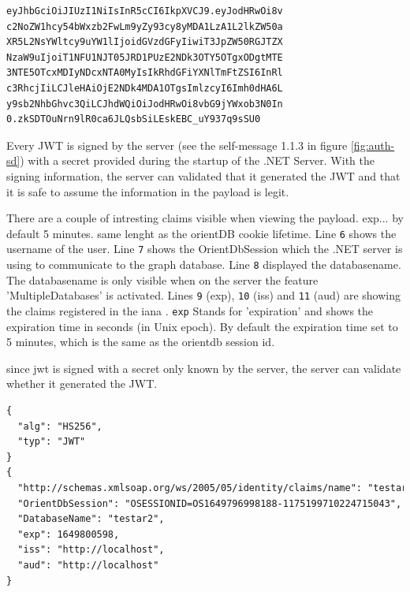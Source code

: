 \begin{lstlisting}[language=xml, caption=Example JSON Web Token (line breaks for display purposes only), style=nonrstyle, label=code:jwt]
eyJhbGciOiJIUzI1NiIsInR5cCI6IkpXVCJ9.eyJodHRwOi8v
c2NoZW1hcy54bWxzb2FwLm9yZy93cy8yMDA1LzA1L2lkZW50a
XR5L2NsYWltcy9uYW1lIjoidGVzdGFyIiwiT3JpZW50RGJTZX
NzaW9uIjoiT1NFU1NJT05JRD1PUzE2NDk3OTY5OTgxODgtMTE
3NTE5OTcxMDIyNDcxNTA0MyIsIkRhdGFiYXNlTmFtZSI6InRl
c3RhcjIiLCJleHAiOjE2NDk4MDA1OTgsImlzcyI6Imh0dHA6L
y9sb2NhbGhvc3QiLCJhdWQiOiJodHRwOi8vbG9jYWxob3N0In
0.zkSDTOuNrn9lR0ca6JLQsbSiLEskEBC_uY937q9sSU0
\end{lstlisting}

Every JWT is signed by the server (see the self-message 1.1.3 in figure \ref{fig:auth-sd}) with a secret provided during the startup of the .NET Server. With the signing information, the server can validated that it generated the JWT and that it is safe to assume the information in the payload is legit. 

There are a couple of intresting claims visible when viewing the payload. exp... by default 5 minutes. same lenght as the orientDB cookie lifetime. Line \verb|6| shows the username of the user. Line \verb|7| shows the OrientDbSession which the .NET server is using to communicate to the graph database. Line \verb|8| displayed the databasename. The databasename is only visible when on the server the feature 'MultipleDatabases' is activated. Lines \verb|9| (exp), \verb|10| (iss) and \verb|11| (aud) are showing the claims registered in the \acrfull{iana} \cite{jones2015json}. \verb|exp| Stands for 'expiration' and shows the expiration time in seconds (in Unix epoch). By default the expiration time set to 5 minutes, which is the same as the orientdb session id. 




since jwt is signed with a secret only known by the server, the server can validate whether it generated the JWT.

\begin{lstlisting}[language=xml, caption=Decoded JWT header and Payload of the JWT given in listing \ref{code:jwt}, label=code:jwt-payload]
{
  "alg": "HS256",
  "typ": "JWT"
}
{
  "http://schemas.xmlsoap.org/ws/2005/05/identity/claims/name": "testar",
  "OrientDbSession": "OSESSIONID=OS1649796998188-1175199710224715043",
  "DatabaseName": "testar2",
  "exp": 1649800598,
  "iss": "http://localhost",
  "aud": "http://localhost"
}
\end{lstlisting}



